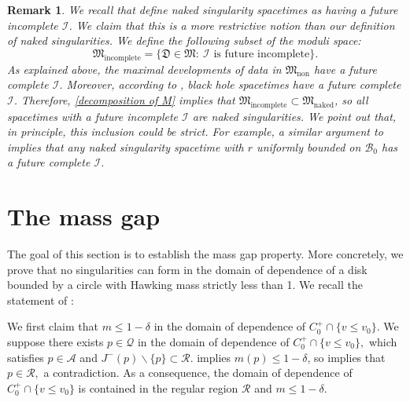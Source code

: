 \documentclass[11pt]{article}
\newtheorem{remark}{Remark}[section]
\numberwithin{equation}{section}
\begin{document}
\begin{remark}\label{remark about I incomplete}
    We recall that \cite{GH78,C99-GL} define naked singularity spacetimes as having a future incomplete $\mathcal{I}$. We claim that this is a more restrictive notion than our definition of naked singularities. We define the following subset of the moduli space:
    \[\mathfrak{M}_{\mathrm{incomplete}}=\big\{\mathfrak{D}\in\mathfrak{M}:\ \mathcal{I}\text{ is future incomplete}\big\}.\]
    As explained above, the maximal developments of data in $\mathfrak{M}_{\mathrm{non}}$ have a  future complete  $\mathcal{I}$. Moreover, according to , black hole spacetimes have a future complete $\mathcal{I}$. Therefore, \eqref{decomposition of M} implies that $\mathfrak{M}_{\mathrm{incomplete}}\subset\mathfrak{M}_{\mathrm{naked}}$, so all spacetimes with a future incomplete $\mathcal{I}$ are naked singularities. We point out that, in principle, this inclusion could be strict. For example, a similar argument to \cite{Dafermos_trapped} implies that any naked singularity spacetime with $r$ uniformly bounded on $\mathcal{B}_0$ has a future complete $\mathcal{I}$.
\end{remark}

\section{The mass gap}\label{mass gap section}

The goal of this section is to establish the mass gap property. More concretely, we prove that no singularities can form in the domain of dependence of a disk bounded by a circle with Hawking mass strictly less than 1. We recall the statement of :
\extension*

We first claim that $m\leq1-\delta$ in the domain of dependence of $C_0^+\cap\{v\leq v_0\}.$ We suppose there exists $p\in\mathcal{Q}$ in the domain of dependence of $C_0^+\cap\{v\leq v_0\},$ which satisfies $p\in\mathcal{A}$ and $J^-(p)\backslash\{p\}\subset\mathcal{R}$.  implies $m(p)\leq1-\delta$, so  implies that $p\in\mathcal{R},$ a contradiction. As a consequence, the domain of dependence of $C_0^+\cap\{v\leq v_0\}$ is contained in the regular region $\mathcal{R}$ and $m\leq1-\delta$.
\end{document}
